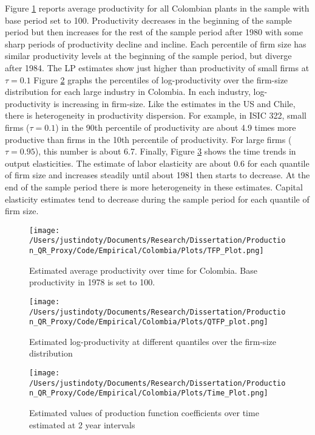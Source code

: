 \documentclass[11pt]{article}
\begin{document}
Figure \ref{fig:COLpgrowth} reports average productivity for all Colombian plants in the sample with base period set to 100. Productivity decreases in the beginning of the sample period but then increases for the rest of the sample period after 1980 with some sharp periods of productivity decline and incline. Each percentile of firm size has similar productivity levels at the beginning of the sample period, but diverge after 1984. The LP estimates show just higher than productivity of small firms at $\tau=0.1$ Figure \ref{fig:COLpdisp} graphs the percentiles of log-productivity over the firm-size distribution for each large industry in Colombia. In each industry, log-productivity is increasing in firm-size. Like the estimates in the US and Chile, there is heterogeneity in productivity dispersion. For example, in ISIC 322, small firms ($\tau=0.1$) in the 90th percentile of productivity are about 4.9 times more productive than firms in the 10th percentile of productivity. For large firms ($\tau=0.95$), this number is about 6.7. Finally, Figure \ref{fig:COLtimecoef} shows the time trends in output elasticities. The estimate of labor elasticity are about 0.6 for each quantile of firm size and increases steadily until about 1981 then starts to decrease. At the end of the sample period there is more heterogeneity in these estimates. Capital elasticity estimates tend to decrease during the sample period for each quantile of firm size.

\begin{figure}[H]
\centering
\texttt{[image: /Users/justindoty/Documents/Research/Dissertation/Production\_QR\_Proxy/Code/Empirical/Colombia/Plots/TFP\_Plot.png]}
\caption{Estimated average productivity over time for Colombia. Base productivity in 1978 is set to 100.}
\label{fig:COLpgrowth}
\end{figure}

\begin{figure}[H]
\centering
\texttt{[image: /Users/justindoty/Documents/Research/Dissertation/Production\_QR\_Proxy/Code/Empirical/Colombia/Plots/QTFP\_plot.png]}
\caption{Estimated log-productivity at different quantiles over the firm-size distribution}
\label{fig:COLpdisp}
\end{figure}


\begin{figure}[H]
\centering
\texttt{[image: /Users/justindoty/Documents/Research/Dissertation/Production\_QR\_Proxy/Code/Empirical/Colombia/Plots/Time\_Plot.png]}
\caption{Estimated values of production function coefficients over time estimated at 2 year intervals}
\label{fig:COLtimecoef}
\end{figure}
\end{document}
